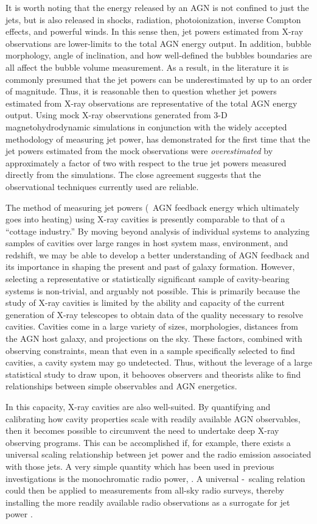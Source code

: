 \documentclass{emulateapj}
\begin{document}
It is worth noting that the energy released by an AGN is not confined
to just the jets, but is also released in shocks, radiation,
photoionization, inverse Compton effects, and powerful winds. In this
sense then, jet powers estimated from X-ray observations are
lower-limits to the total AGN energy output. In addition, bubble
morphology, angle of inclination, and how well-defined the bubbles
boundaries are all affect the bubble volume measurement. As a result,
in the literature it is commonly presumed that the jet powers can be
underestimated by up to an order of magnitude. Thus, it is reasonable
then to question whether jet powers estimated from X-ray observations
are representative of the total AGN energy output. Using mock X-ray
observations generated from 3-D magnetohydrodynamic simulations in
conjunction with the widely accepted methodology of measuring jet
power, \citet{2009arXiv0909.0722M} has demonstrated for the first time
that the jet powers estimated from the mock observations were
{\it{overestimated}} by approximately a factor of two with respect to
the true jet powers measured directly from the simulations. The close
agreement suggests that the observational techniques currently used
are reliable.

The method of measuring jet powers (\ie\ AGN feedback energy which
ultimately goes into heating) using X-ray cavities is presently
comparable to that of a ``cottage industry.'' By moving beyond
analysis of individual systems to analyzing samples of cavities over
large ranges in host system mass, environment, and redshift, we may be
able to develop a better understanding of AGN feedback and its
importance in shaping the present and past of galaxy
formation. However, selecting a representative or statistically
significant sample of cavity-bearing systems is non-trivial, and
arguably not possible. This is primarily because the study of X-ray
cavities is limited by the ability and capacity of the current
generation of X-ray telescopes to obtain data of the quality necessary
to resolve cavities. Cavities come in a large variety of sizes,
morphologies, distances from the AGN host galaxy, and projections on
the sky. These factors, combined with observing constraints, mean that
even in a sample specifically selected to find cavities, a cavity
system may go undetected. Thus, without the leverage of a large
statistical study to draw upon, it behooves observers and theorists
alike to find relationships between simple observables and AGN
energetics. 

In this capacity, X-ray cavities are also well-suited. By quantifying
and calibrating how cavity properties scale with readily available AGN
observables, then it becomes possible to circumvent the need to
undertake deep X-ray observing programs. This can be accomplished if,
for example, there exists a universal scaling relationship between jet
power and the radio emission associated with those jets. A very simple
quantity which has been used in previous investigations is the
monochromatic radio power, \prad. A universal \pjet-\prad\ scaling
relation could then be applied to measurements from all-sky radio
surveys, thereby installing the more readily available radio
observations as a surrogate for jet power \citep{croton06,
  2006MNRAS.366..397S}.
\end{document}

